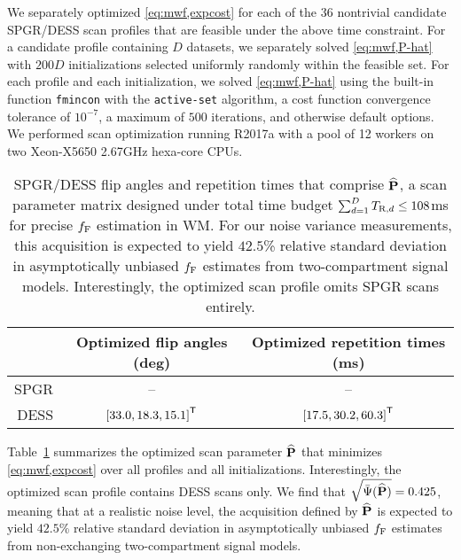 We separately optimized \eqref{eq:mwf,expcost}
for each of the 36
nontrivial candidate SPGR/DESS scan profiles
that are feasible under the above time constraint.
For a candidate profile containing $D$ datasets,
we separately solved \eqref{eq:mwf,P-hat}
with $200D$ initializations
selected uniformly randomly 
within the feasible set.
For each profile
and each initialization,
we solved \eqref{eq:mwf,P-hat}
using the built-in \matlab function \texttt{fmincon}
with the \texttt{active-set} algorithm,
a cost function convergence tolerance of $10^{-7}$,
a maximum of $500$ iterations,
and otherwise default options.
We performed scan optimization
running \matlab R2017a 
with a pool of 12 workers
on two Xeon-X5650 2.67GHz hexa-core CPUs.

\begin{table}[!tb]
  \centering
  \begin{tabular}{r | c | c}
    \hline
    \hline
    & Optimized flip angles (deg) & Optimized repetition times (ms) \\
    \hline
    SPGR & -- 														& -- \\
    DESS & $\brac{33.0,18.3,15.1}\tpose$ 	& $\brac{17.5,30.2,60.3}\tpose$ \\
    \hline
    \hline
  \end{tabular}
  \caption{
		SPGR/DESS flip angles and repetition times
		that comprise $\widehat{\mathbf{P}}$,
		a scan parameter matrix designed
		under total time budget 
		$\sum_{d=1}^D T_{\mathrm{R},d} \leq 108$ms
		for precise $f_{\mathrm{F}}$ estimation in WM.
		For our noise variance measurements,
		this acquisition is expected
		to yield $42.5$\% relative standard deviation
		in asymptotically unbiased $f_{\mathrm{F}}$ estimates
		from two-compartment signal models.
		Interestingly,
		the optimized scan profile
		omits SPGR scans entirely.
  }
  \label{tab:mwf,acq}
\end{table}

Table~\ref{tab:mwf,acq} summarizes
the optimized scan parameter $\widehat{\mathbf{P}}$ 
that minimizes \eqref{eq:mwf,expcost}
over all profiles and all initializations.
Interestingly,
the optimized scan profile 
contains DESS scans only.
We find that $\sqrt{\bar{\Psi}(\widehat{\mathbf{P}})} = 0.425$, 
meaning that at a realistic noise level,
the acquisition defined by $\widehat{\mathbf{P}}$
is expected to yield $42.5$\% relative standard deviation
in asymptotically unbiased $f_{\mathrm{F}}$ estimates
from non-exchanging two-compartment signal models.
%

